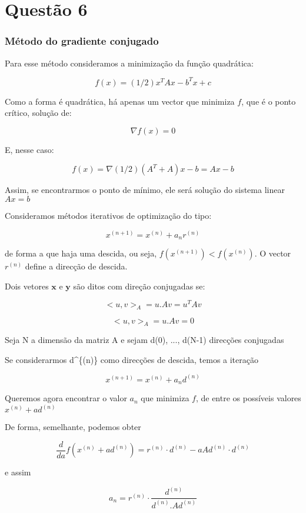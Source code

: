\documentclass[11pt]{article}
\begin{document}
    \section{Questão 6}\label{questuxe3o-6}

    \subsubsection{Método do gradiente
conjugado}\label{muxe9todo-do-gradiente-conjugado}

Para esse método consideramos a minimização da função quadrática:

\[ f(x)= (1/2) x^TAx -b^Tx + c \]

Como a forma é quadrática, há apenas um vector que minimiza \(f\), que é
o ponto crítico, solução de:

\[ \nabla f(x) = 0 \]

E, nesse caso:

\[ f(x) = \nabla (1/2)(A^T+A)x-b = Ax -b \]

Assim, se encontrarmos o ponto de mínimo, ele será solução do sistema
linear \(Ax = b\)

Consideramos métodos iterativos de optimização do tipo:

\[ x^{(n+1)} = x^{(n)}+ a_n r^{(n)} \]

de forma a que haja uma descida, ou seja, \(f(x^{(n+1)}) < f(x^{(n)})\).
O vector \(r^{(n)}\) define a direcção de descida.

Dois vetores \(\textbf{x}\) e \(\textbf{y}\) são ditos com direção
conjugadas se:

\[ <u,v>_A= u . Av = u^TAv \]

\[ <u,v>_A= u . Av = 0 \]

Seja N a dimensão da matriz A e sejam d(0), ..., d(N-1) direcções
conjugadas

Se considerarmos d\^{}\{(n)\} como direcções de descida, temos a
iteração

\[ x^{(n+1)} = x^{(n)} + a_nd^{(n)} \]

Queremos agora encontrar o valor \(a_n\) que minimiza \(f\), de entre os
possíveis valores \(x^{(n)} + ad^{(n)}\)

De forma, semelhante, podemos obter

\[ \frac{d}{da}  f(x^{(n)} + ad^{(n)}) =  r^{(n)} \cdot d^{(n)}-aAd^{(n)}\cdot d^{(n)} \]

e assim

\[ a_n = r^{(n)} \cdot \frac{d^{(n)}}{d^{(n)} . Ad^{(n)}} \]
\end{document}

